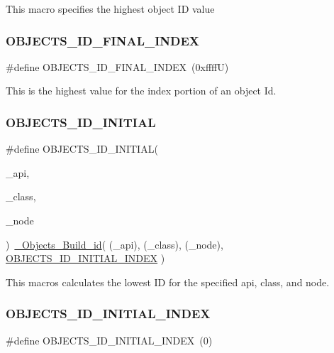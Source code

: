 This macro specifies the highest object ID value \mbox{\label{group__RTEMSScoreObject_gadec3b3e06c06eaa198708069b727aa77}} 
\subsubsection{\texorpdfstring{OBJECTS\_ID\_FINAL\_INDEX}{OBJECTS\_ID\_FINAL\_INDEX}}
{\footnotesize\ttfamily \#define O\+B\+J\+E\+C\+T\+S\+\_\+\+I\+D\+\_\+\+F\+I\+N\+A\+L\+\_\+\+I\+N\+D\+EX~(0xffff\+U)}

This is the highest value for the index portion of an object Id. \mbox{\label{group__RTEMSScoreObject_ga7ad5e19b6b3d77541c5c272188a71fbe}} 
\subsubsection{\texorpdfstring{OBJECTS\_ID\_INITIAL}{OBJECTS\_ID\_INITIAL}}
{\footnotesize\ttfamily \#define O\+B\+J\+E\+C\+T\+S\+\_\+\+I\+D\+\_\+\+I\+N\+I\+T\+I\+AL(\begin{DoxyParamCaption}\item[{}]{\+\_\+api,  }\item[{}]{\+\_\+class,  }\item[{}]{\+\_\+node }\end{DoxyParamCaption})~\mbox{\hyperlink{group__RTEMSScoreObject_ga96bdcf529c56b52cab7504a171d26211}{\+\_\+\+Objects\+\_\+\+Build\+\_\+id}}( (\+\_\+api), (\+\_\+class), (\+\_\+node), \mbox{\hyperlink{group__RTEMSScoreObject_ga6aa91d4f58b2769c52ef2194fa6446e3}{O\+B\+J\+E\+C\+T\+S\+\_\+\+I\+D\+\_\+\+I\+N\+I\+T\+I\+A\+L\+\_\+\+I\+N\+D\+EX}} )}

This macros calculates the lowest ID for the specified api, class, and node. \mbox{\label{group__RTEMSScoreObject_ga6aa91d4f58b2769c52ef2194fa6446e3}} 
\subsubsection{\texorpdfstring{OBJECTS\_ID\_INITIAL\_INDEX}{OBJECTS\_ID\_INITIAL\_INDEX}}
{\footnotesize\ttfamily \#define O\+B\+J\+E\+C\+T\+S\+\_\+\+I\+D\+\_\+\+I\+N\+I\+T\+I\+A\+L\+\_\+\+I\+N\+D\+EX~(0)}

